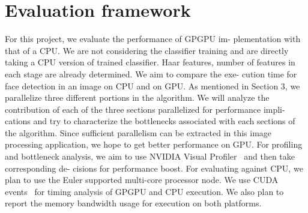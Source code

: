\section{Evaluation framework}\label{sec:eval}


For this project, we evaluate the performance of GPGPU im-
plementation with that of a CPU. We are not considering the
classifier training and are directly taking a CPU version of
trained classifier. Haar features, number of features in each
stage are already determined. We aim to compare the exe-
cution time for face detection in an image on CPU and on
GPU. As mentioned in Section 3, we parallelize three different
portions in the algorithm. We will analyze the contribution of
each of the three sections parallelized for performance impli-
cations and try to characterize the bottlenecks associated with
each sections of the algorithm. Since sufficient parallelism
can be extracted in this image processing application, we hope
to get better performance on GPU.
For profiling and bottleneck analysis, we aim to use
NVIDIA Visual Profiler~\cite{rosen2013visual} and then take corresponding de-
cisions for performance boost. For evaluating against CPU,
we plan to use the Euler supported multi-core processor node.
We use CUDA events~\cite{wilt2013cuda} for timing analysis of GPGPU and
CPU execution. We also plan to report the memory bandwidth
usage for execution on both platforms.

